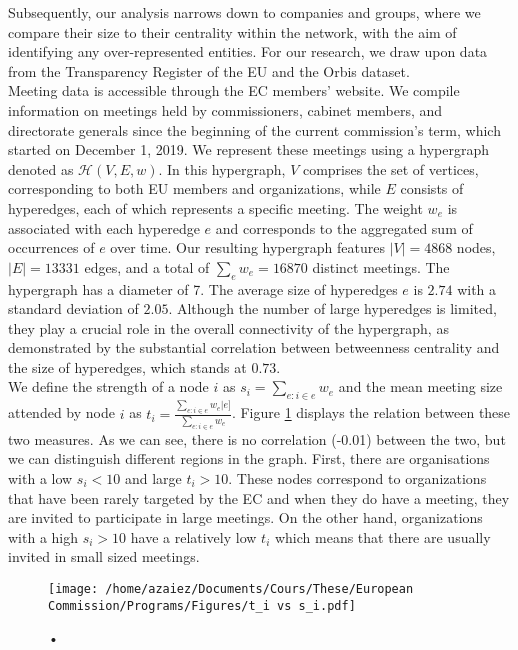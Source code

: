\documentclass[ 11pt]{article}
\begin{document}
Subsequently, our analysis narrows down to companies and groups, where we compare their size to their centrality within the network, with the aim of identifying any over-represented entities. For our research, we draw upon data from the Transparency Register of the EU and the Orbis dataset.\\

Meeting data is accessible through the EC members' website. 
We compile information on meetings held by commissioners, cabinet members, and directorate generals since the beginning of the current commission's term, which started on December 1, 2019.
We represent these meetings using a hypergraph denoted as $\mathcal{H}(V, E, w)$. In this hypergraph, $V$ comprises the set of vertices, corresponding to both EU members and organizations, while $E$ consists of hyperedges, each of which represents a specific meeting. The weight $w_e$ is associated with each hyperedge $e$ and corresponds to the aggregated sum of occurrences of $e$ over time.
Our resulting hypergraph features $|V| = 4868$ nodes, $|E| = 13331$ edges, and a total of $\sum_e w_e = 16870$ distinct meetings. The hypergraph has a diameter of 7.
The average size of hyperedges $e$ is $2.74$ with a standard deviation of $2.05$. 
Although the number of large  hyperedges is limited, they play a crucial role in the overall connectivity of the hypergraph, as demonstrated by the substantial correlation between betweenness centrality and the size of hyperedges, which stands at $0.73$.  \\

We define the strength of a node $i$ as $s_i = \sum_{e: i \in e} w_e$ and the mean meeting size attended by node $i$ as $t_i = \frac{\sum_{e: i \in e} w_e |e]}{\sum_{e: i \in e} w_e }$. 
Figure \ref{fig: t_i vs s_i} displays the relation between these two measures. As we can see, there is no correlation (-0.01) between the two, but we can distinguish different regions in the graph.
First, there are organisations with a low $s_i <10$ and large $t_i>10$.
These nodes correspond to organizations that have been rarely targeted by the EC and when they do have a meeting, they are invited to participate in large meetings. 
On the other hand, organizations with a high $s_i>10$ have a relatively low $t_i$ which means that there are usually invited in small sized meetings. 



\begin{figure}
	\centering
	\texttt{[image: /home/azaiez/Documents/Cours/These/European Commission/Programs/Figures/t\_i vs s\_i.pdf]}
	\caption{•}
	\label{fig: t_i vs s_i}
\end{figure}
\end{document}
